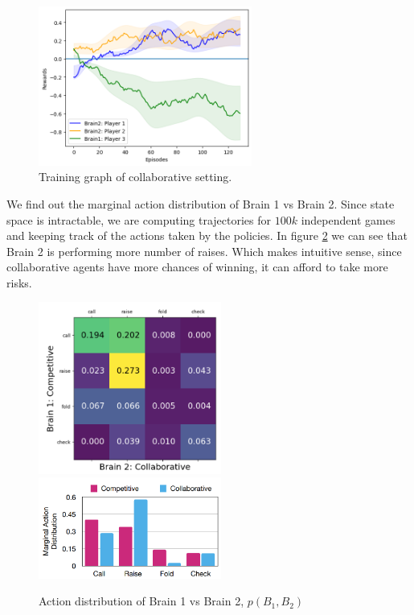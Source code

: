 \documentclass{article}
\begin{document}
\begin{figure}[h]
    \centering
    \includegraphics[width=7cm]{./images/train_4bits_multi.png}
    \caption{Training graph of collaborative setting.}
    \label{fig:train_4_bits_multi}
\end{figure}

We find out the marginal action distribution of Brain 1 vs Brain 2. Since state space is intractable, we are computing trajectories for $100k$ independent games and keeping track of the actions taken by the policies. In figure \ref{fig:confusion_matrix} we can see that Brain 2 is performing more number of raises. Which makes intuitive sense, since collaborative agents have more chances of winning, it can afford to take more risks.


\begin{figure}[h]
    \centering
    \includegraphics[width=6cm]{./images/confusion_matrix.png}
    \includegraphics[width=6cm]{./images/bar_graph.png}
    \caption{Action distribution of Brain 1 vs Brain 2, $p(B_1, B_2)$}
    \label{fig:confusion_matrix}
\end{figure}
\end{document}
